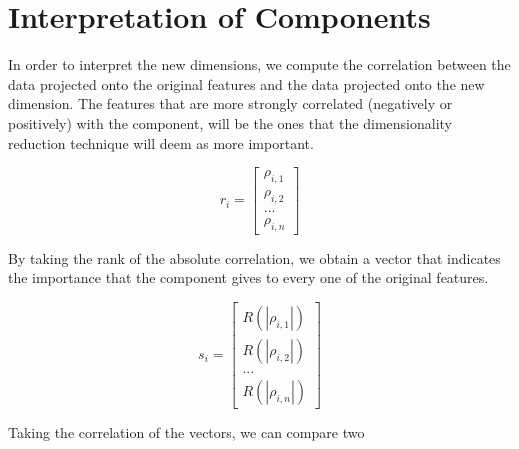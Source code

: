 \section{Interpretation of Components}
In order to interpret the new dimensions, we compute the correlation between the data projected onto the original features and the data projected onto the new dimension. The features that are more strongly correlated (negatively or positively) with the component, will be the ones that the dimensionality reduction technique will deem as more important.

$$
    r_i =
    \begin{bmatrix}
        \rho_{i,1} \\
        \rho_{i,2} \\
        ...        \\
        \rho_{i,n}
    \end{bmatrix}
$$

By taking the rank of the absolute correlation, we obtain a vector that indicates the importance that the component gives to every one of the original features.

$$
    s_i =
    \begin{bmatrix}
        R(|\rho_{i,1}|) \\
        R(|\rho_{i,2}|) \\
        ...             \\
        R(|\rho_{i,n}|)
    \end{bmatrix}
$$

Taking the correlation of the vectors, we can compare two


